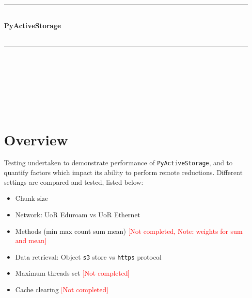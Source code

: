 \documentclass{article}
\date{\today}
\newcommand{\horrule}[1]{\rule{\linewidth}{#1}} %
\begin{document}
\date{\today}
\begin{titlepage}
   \begin{center}
        \horrule{2pt} \\[0.5cm] %
              \Large\textbf{PyActiveStorage}\\
              \Large{}\\
        \horrule{2pt} \\[0.5cm] %
         
         \large{}\\
         \large{}\\
         \large{}\\
         \large\text{\today}\\
         \large{}\\
   \end{center}





\end{titlepage}
   
\begin{versionhistory}
\end{versionhistory}

\setcounter{table}{0}

\section{Overview}

Testing undertaken to demonstrate performance of \texttt{PyActiveStorage}, and to quantify factors which impact its ability to perform remote reductions. Different settings are compared and tested, listed below:
\begin{itemize}
    \item Chunk size
    \item Network: UoR Eduroam vs UoR Ethernet
    \item Methods (min max count sum mean) \textcolor{red}{[Not completed, Note: weights for sum and mean]}
    \item Data retrieval: Object \texttt{s3} store vs \texttt{https} protocol
    \item Maximum threads set \textcolor{red}{[Not completed]}
    \item Cache clearing \textcolor{red}{[Not completed]}
    \end{itemize}
\end{document}
